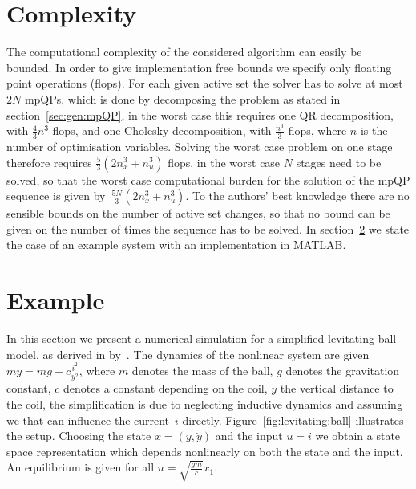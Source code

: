 \section{Complexity}\label{sec:complexity}
The computational complexity of the considered algorithm can easily be bounded. In order to give implementation
free bounds we specify only floating point operations (flops). For each given active set the solver has
to solve at most $2N$ mpQPs, which is done by decomposing the problem as stated in section~\ref{sec:gen:mpQP},
in the worst case this requires one QR decomposition, with $\frac{4}{3}n^3$ flops, and one Cholesky decomposition,
with $\frac{n^3}{3}$ flops, where $n$ is the number of optimisation variables. Solving the worst case problem
on one stage therefore requires $\frac{5}{3}(2n_x^3+n_u^3)$ flops, in the worst case $N$ stages need to be solved,
so that the worst case computational burden for the solution of the mpQP sequence is given 
by~$\frac{5N}{3}(2n_x^3+n_u^3)$. To the authors' best knowledge there are no sensible bounds on the number of
active set changes, so that no bound can be given on the number of times the sequence has to be solved.
In section~\ref{sec:example} we state the case of an example system with an implementation in MATLAB.


\section{Example}\label{sec:example}
In this section we present a numerical simulation for a simplified levitating ball model, as derived in 
by~\cite{Schaich:2015}. The dynamics of the nonlinear system are given $m\ddot y = m g - c\frac{i^2}{y^2}$,
where $m$ denotes the mass of the ball, $g$ denotes the gravitation constant, $c$ denotes a constant depending
on the coil, $y$ the vertical distance to the coil, the simplification is due to neglecting inductive dynamics 
and assuming we that can influence the current~$i$ directly. Figure~\ref{fig:levitating:ball} illustrates the setup.
Choosing the state $x=(y,\dot y)$ and the input $u=i$ we obtain a state space representation which depends nonlinearly
on both the state and the input. An equilibrium is given for all $u=\sqrt{\frac{gm}{c}}x_1$.

